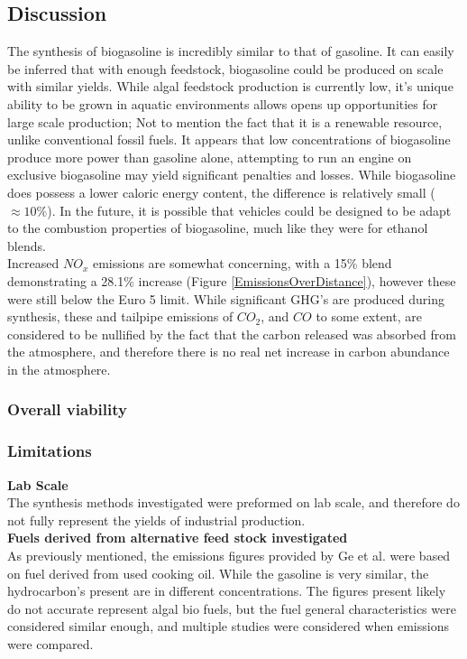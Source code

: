 \documentclass[10pt,a4paper]{article}
\begin{document}
	\subsection{Discussion}
	The synthesis of biogasoline is incredibly similar to that of gasoline. It can easily be inferred that with enough feedstock, biogasoline could be produced on scale with similar yields. While algal feedstock production is currently low, it's unique ability to be grown in aquatic environments allows opens up opportunities for large scale production; Not to mention the fact that it is a renewable resource, unlike conventional fossil fuels. 
	It appears that low concentrations of biogasoline produce more power than gasoline alone, attempting to run an engine on exclusive biogasoline may yield significant penalties and losses. While biogasoline does possess a lower caloric energy content, the difference is relatively small ($\approx 10\%$). In the future, it is possible that vehicles could be designed to be adapt to the combustion properties of biogasoline, much like they were for ethanol blends.\\
	Increased $NO_x$ emissions are somewhat concerning, with a 15\% blend demonstrating a 28.1\% increase (Figure \ref{EmissionsOverDistance}), however these were still below the Euro 5 limit. While significant GHG's are produced during synthesis, these and tailpipe emissions of $CO_2$, and $CO$ to some extent, are considered to be nullified by the fact that the carbon released was absorbed from the atmosphere, and therefore there is no real net increase in carbon abundance in the atmosphere.
	\subsubsection{Overall viability}
	
	\subsubsection{Limitations}\label{limitations} 

		\textbf{Lab Scale}\\
		The synthesis methods investigated were preformed on lab scale, and therefore do not fully represent the yields of industrial production.\\
		\textbf{Fuels derived from alternative feed stock investigated}\\
		As previously mentioned, the emissions figures provided by Ge et al. were based on fuel derived from used cooking oil. While the gasoline is very similar, the hydrocarbon's present are in different concentrations. The figures present likely do not accurate represent algal bio fuels, but the fuel general characteristics were considered similar enough, and multiple studies were considered when emissions were compared.
\end{document}
